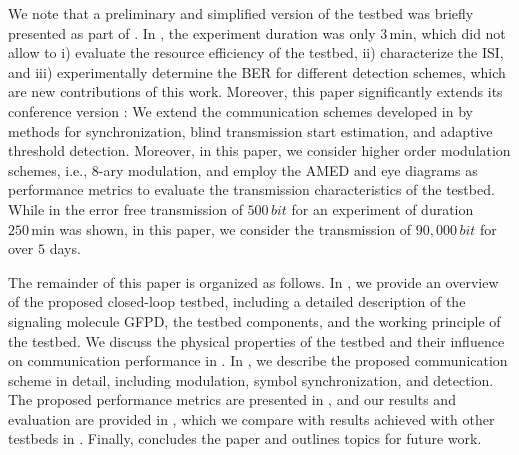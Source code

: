 %
We note that a preliminary and simplified version of the testbed was briefly presented as part of \cite{brand2023switchable}. In \cite{brand2023switchable}, the experiment duration was only $3 \,\si{\minute}$, which did not allow to i) evaluate the resource efficiency of the testbed, ii) characterize the \ac{ISI}, and iii) experimentally determine the \ac{BER} for different detection schemes, which are new contributions of this work. 
%
Moreover, this paper significantly extends its conference version \cite{brand2024closed}: We extend the communication schemes developed in \cite{brand2024closed} by methods for synchronization, blind transmission start estimation, and adaptive threshold detection. Moreover, in this paper, we consider higher order modulation schemes, i.e., 8-ary modulation, and employ the \ac{AMED} and eye diagrams as performance metrics to evaluate the transmission characteristics of the testbed. While in \cite{brand2024closed}  the error free transmission of $500\, \si{bit}$ for an experiment of duration $250 \,\si{\minute}$ was shown, in this paper, we consider the transmission of $90,000\,\si{bit}$ for over $5$ days. 

The remainder of this paper is organized as follows. In , we provide an overview of the proposed closed-loop testbed, including a detailed description of the signaling molecule \ac{GFPD}, the testbed components, and the working principle of the testbed. We discuss the physical properties of the testbed and their influence on communication performance in . In , we describe the proposed communication scheme in detail, including modulation, symbol synchronization, and detection. The proposed performance metrics are presented in , and our results and evaluation are provided in , which we compare with results achieved with other testbeds in . Finally,  concludes the paper and outlines topics for future work.